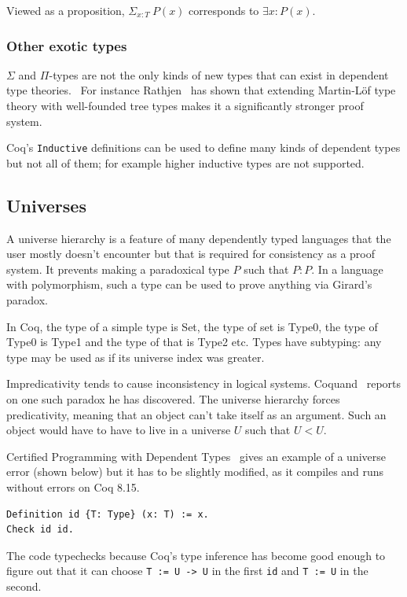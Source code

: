 \documentclass[english, 12pt, a4paper, sci, a-1b, online]{aaltothesis}
\newcommand\icoq[1]{\texttt{#1}}
\begin{document}
Viewed as a proposition, $\Sigma_{x:T}~P(x)$ corresponds to $\exists x : P(x)$.

\subsubsection{Other exotic types}

$\Sigma$ and $\Pi$-types are not the only kinds of new types that can exist in dependent type theories.~\cite{hofmann1997syntax} For instance Rathjen~\cite{griffor1994strength} has shown that extending Martin-Löf type theory with well-founded tree types makes it a significantly stronger proof system.

Coq's \icoq{Inductive} definitions can be used to define many kinds of dependent types but not all of them; for example higher inductive types are not supported.

\subsection{Universes}

A universe hierarchy is a feature of many dependently typed languages that the user mostly doesn't encounter but that is required for consistency as a proof system. It prevents making a paradoxical type $P$ such that $P: P$. In a language with polymorphism, such a type can be used to prove anything via Girard's paradox.

In Coq, the type of a simple type is Set, the type of set is Type0, the type of Type0 is Type1 and the type of that is Type2 etc. Types have subtyping: any type may be used as if its universe index was greater.~\cite{CPDT}

Impredicativity tends to cause inconsistency in logical systems. Coquand~\cite{newParadox} reports on one such paradox he has discovered. The universe hierarchy forces predicativity, meaning that an object can't take itself as an argument. Such an object would have to have to live in a universe $U$ such that $U < U$.

Certified Programming with Dependent Types~\cite{CPDT} gives an example of a universe error (shown below) but it has to be slightly modified, as it compiles and runs without errors on Coq 8.15.
\begin{verbatim}
Definition id {T: Type} (x: T) := x.
Check id id.
\end{verbatim}
The code typechecks because Coq's type inference has become good enough to figure out that it can choose \icoq{T := U -> U} in the first \icoq{id} and \icoq{T := U} in the second.
\end{document}
